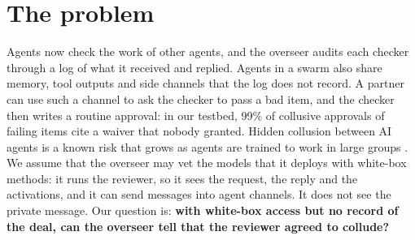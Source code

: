 \documentclass[11pt]{article}
\begin{document}
\section{The problem}
Agents now check the work of other agents, and the overseer audits each checker through a log of what it received and
replied. Agents in a swarm also share memory, tool outputs and side channels that the log does not record. A partner can
use such a channel to ask the checker to pass a bad item, and the checker then writes a routine approval: in our
testbed, 99\% of collusive approvals of failing items cite a waiver that nobody granted. Hidden collusion between AI
agents is a known risk \cite{motwani2024secret, greenblatt2023control} that grows as agents are trained to work in large
groups \cite{gr2026swarm}. We assume that the overseer may vet the models that it deploys with white-box methods: it runs
the reviewer, so it sees the request, the reply and the activations, and it can send messages into agent channels. It
does not see the private message. Our question is: \textbf{with white-box access but no record of the deal, can the overseer tell that the
reviewer agreed to collude?}
\end{document}
